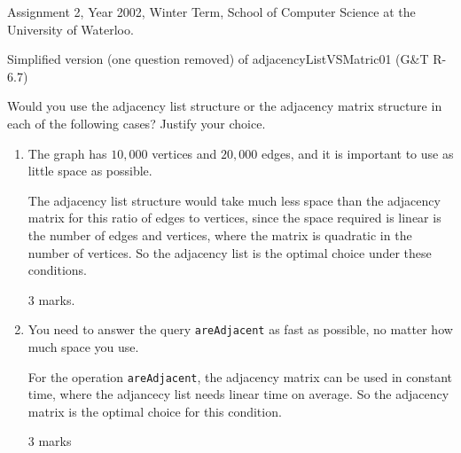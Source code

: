 \begin{usage}
Assignment 2, Year 2002, Winter Term, School of Computer Science at the University of Waterloo.
\end{usage}
\begin{authorship}
Simplified version (one question removed) of adjacencyListVSMatric01 (G\&T R-6.7)
\end{authorship}

Would you use the adjacency list structure or the adjacency matrix
structure in each of the following cases?
%
Justify your choice.


\begin{enumerate}

\item The graph has $10,000$ vertices and $20,000$ edges, and it is
important to use as little space as possible.
\begin{solution}
The adjacency list structure would take much less space than the
adjacency matrix for this ratio of edges to vertices, since the space
required is linear is the number of edges and vertices, where the
matrix is quadratic in the number of vertices. So the adjacency list
is the optimal choice under these conditions.
\end{solution}
\begin{markingScheme}
$3$ marks.
\end{markingScheme}

\item You need to answer the query {\tt areAdjacent} as fast as
possible, no matter how much space you use.
\begin{solution}
For the operation {\tt areAdjacent}, the adjacency matrix can be used
in constant time, where the adjancecy list needs linear time on
average.
%
So the adjacency matrix is the optimal choice for this condition.
\end{solution}
\begin{markingScheme}
$3$ marks
\end{markingScheme}

\end{enumerate}
